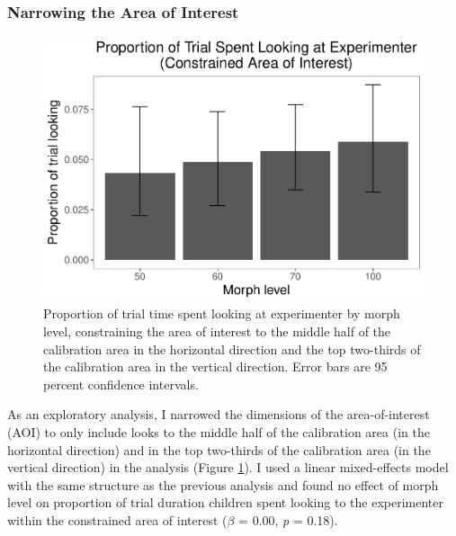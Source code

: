 \documentclass[floatsintext,man]{apa6}
\theoremstyle{definition}
\theoremstyle{definition}
\theoremstyle{definition}
\theoremstyle{remark}
\begin{document}
\subsubsection{Narrowing the Area of
Interest}\label{narrowing-the-area-of-interest}

\begin{figure}
\centering
\includegraphics{soc_ref_category_paper_files/figure-latex/morphconstrained-1.pdf}
\caption{\label{fig:morphconstrained}Proportion of trial time spent looking
at experimenter by morph level, constraining the area of interest to the
middle half of the calibration area in the horizontal direction and the
top two-thirds of the calibration area in the vertical direction. Error
bars are 95 percent confidence intervals.}
\end{figure}

As an exploratory analysis, I narrowed the dimensions of the
area-of-interest (AOI) to only include looks to the middle half of the
calibration area (in the horizontal direction) and in the top two-thirds
of the calibration area (in the vertical direction) in the analysis
(Figure \ref{fig:morphconstrained}). I used a linear mixed-effects model
with the same structure as the previous analysis and found no effect of
morph level on proportion of trial duration children spent looking to
the experimenter within the constrained area of interest (\(\beta\) =
0.00, \emph{p} = 0.18).
\end{document}
